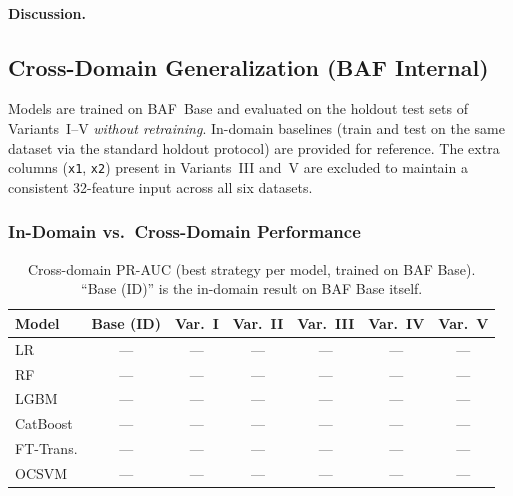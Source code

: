 \paragraph{Discussion.}



\subsection{Cross-Domain Generalization (BAF Internal)}
\label{sec:cross_domain_results}

Models are trained on BAF~Base and evaluated on the holdout test sets
of Variants~I--V \emph{without retraining}.
In-domain baselines (train and test on the same dataset via the standard
holdout protocol) are provided for reference.
The extra columns (\texttt{x1}, \texttt{x2}) present in Variants~III
and~V are excluded to maintain a consistent 32-feature input across
all six datasets.

\subsubsection{In-Domain vs.\ Cross-Domain Performance}

\begin{table}[ht]
\centering
\caption{Cross-domain PR-AUC (best strategy per model, trained on BAF Base).
  ``Base (ID)'' is the in-domain result on BAF Base itself.}
\label{tab:crossdomain_prauc}
\begin{tabular}{l c c c c c c}
\toprule
Model & Base (ID) & Var.~I & Var.~II & Var.~III & Var.~IV & Var.~V \\
\midrule
LR        & --- & --- & --- & --- & --- & --- \\
RF        & --- & --- & --- & --- & --- & --- \\
LGBM      & --- & --- & --- & --- & --- & --- \\
CatBoost  & --- & --- & --- & --- & --- & --- \\
FT-Trans. & --- & --- & --- & --- & --- & --- \\
OCSVM     & --- & --- & --- & --- & --- & --- \\
\bottomrule
\end{tabular}
\end{table}

